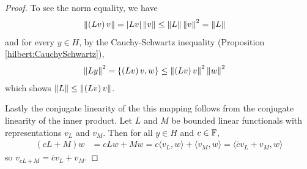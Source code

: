 \begin{proof}
To see the norm equality, we have
\begin{align*}
  \left \lVert \left(Lv\right) v \right \rVert &= \left \vert Lv \right \vert \left \lVert v \right \rVert \leq \left \lVert L \right \rVert
                             \left \lVert v \right \rVert^2 = \left \lVert L \right \rVert
\end{align*}
and for every $y \in H$, by the Cauchy-Schwartz inequality  (Proposition \ref{hilbert:CauchySchwartz}),
\begin{align*}
  \left \lVert Ly \right \rVert^2 &= \lbrace \left(Lv\right) v, w \rbrace
                \leq \left \lVert \left(Lv\right) v \right \rVert^2 \left \lVert w \right \rVert^2
\end{align*}
which shows $\left \lVert L \right \rVert \leq \left \lVert \left(Lv\right) v \right \rVert$.

Lastly the conjugate linearity of the this mapping follows from the conjugate linearity of
the inner product.   Let $L$ and $M$ be bounded linear functionals
with representations $v_L$ and $v_M$.   Then for all $y \in H$ and $c
\in \mathbb{F}$,
\begin{align*}
  \left(cL + M \right)w &= cLw + Mw = c \langle v_L, w\rangle +
                           \langle v_M, w\rangle = \langle
                           \overline{c} v_L + v_M , w \rangle
\end{align*}
so $v_{cL + M} = \overline{c} v_L + v_M$.
\end{proof}

